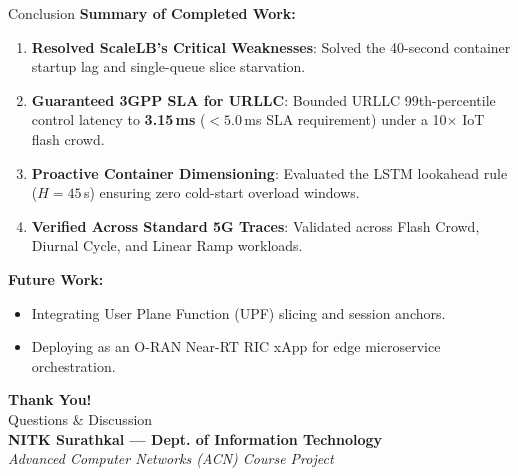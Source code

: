 \documentclass[aspectratio=169,10pt]{beamer}
\begin{document}
\begin{frame}{Conclusion}
    \textbf{Summary of Completed Work:}
    \begin{enumerate}
        \item \textbf{Resolved ScaleLB's Critical Weaknesses}: Solved the 40-second container startup lag and single-queue slice starvation.
        \item \textbf{Guaranteed 3GPP SLA for URLLC}: Bounded URLLC 99th-percentile control latency to \textbf{3.15\,ms} ($< 5.0$\,ms SLA requirement) under a 10$\times$ IoT flash crowd.
        \item \textbf{Proactive Container Dimensioning}: Evaluated the LSTM lookahead rule ($H=45$\,s) ensuring zero cold-start overload windows.
        \item \textbf{Verified Across Standard 5G Traces}: Validated across Flash Crowd, Diurnal Cycle, and Linear Ramp workloads.
    \end{enumerate}

    \vspace{0.2cm}
    \textbf{Future Work:}
    \begin{itemize}
        \item Integrating User Plane Function (UPF) slicing and session anchors.
        \item Deploying as an O-RAN Near-RT RIC xApp for edge microservice orchestration.
    \end{itemize}
\end{frame}

\begin{frame}
    \begin{center}
        \vspace{1.0cm}
        {\Huge \textbf{Thank You!}} \\[0.5cm]
        {\Large Questions \& Discussion} \\[1.0cm]
        \textbf{NITK Surathkal --- Dept. of Information Technology} \\
        \textit{Advanced Computer Networks (ACN) Course Project}
    \end{center}
\end{frame}
\end{document}
